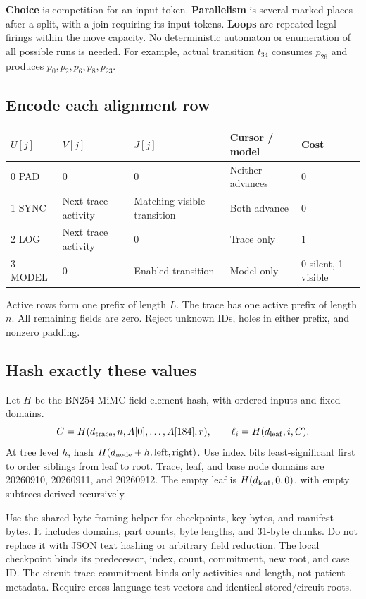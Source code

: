 \documentclass[10pt,a4paper]{article}
\newcommand{\must}[1]{\textbf{#1}}
\begin{document}
\must{Choice} is competition for an input token. \must{Parallelism} is several marked places after a split, with a join requiring its input tokens. \must{Loops} are repeated legal firings within the move capacity. No deterministic automaton or enumeration of all possible runs is needed. For example, actual transition $t_{34}$ consumes $p_{26}$ and produces $p_0,p_2,p_6,p_8,p_{23}$.

\subsection*{Encode each alignment row}
\begin{center}
\begin{tabular}{@{}lllll@{}}
\toprule
$U[j]$ & $V[j]$ & $J[j]$ & Cursor / model & Cost\\
\midrule
0 PAD & 0 & 0 & Neither advances & 0\\
1 SYNC & Next trace activity & Matching visible transition & Both advance & 0\\
2 LOG & Next trace activity & 0 & Trace only & 1\\
3 MODEL & 0 & Enabled transition & Model only & 0 silent, 1 visible\\
\bottomrule
\end{tabular}
\end{center}
Active rows form one prefix of length $L$. The trace has one active prefix of length $n$. All remaining fields are zero. Reject unknown IDs, holes in either prefix, and nonzero padding.

\subsection*{Hash exactly these values}
Let $H$ be the BN254 MiMC field-element hash, with ordered inputs and fixed domains.
\[
C=H(d_{\rm trace},n,A[0],\ldots,A[184],r),\qquad
\ell_i=H(d_{\rm leaf},i,C).
\]
At tree level $h$, hash $H(d_{\rm node}+h,\mathrm{left},\mathrm{right})$. Use index bits least-significant first to order siblings from leaf to root. Trace, leaf, and base node domains are 20260910, 20260911, and 20260912. The empty leaf is $H(d_{\rm leaf},0,0)$, with empty subtrees derived recursively.

Use the shared byte-framing helper for checkpoints, key bytes, and manifest bytes. It includes domains, part counts, byte lengths, and 31-byte chunks. Do not replace it with JSON text hashing or arbitrary field reduction. The local checkpoint binds its predecessor, index, count, commitment, new root, and case ID. The circuit trace commitment binds only activities and length, not patient metadata. Require cross-language test vectors and identical stored/circuit roots.
\end{document}
